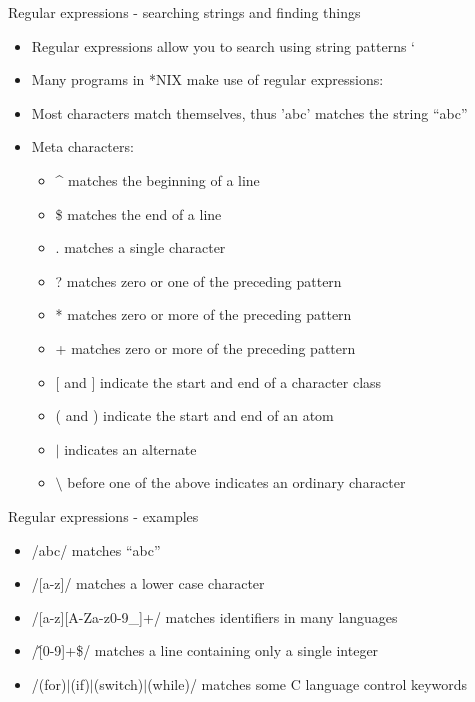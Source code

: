 \documentclass[t]{beamer}
\begin{document}
\begin{frame}{Regular expressions - searching strings and finding things}
  \begin{itemize}
  \item Regular expressions allow you to search using string patterns
` \item Many programs in *NIX make use of regular expressions:
  \item Most characters match themselves, thus 'abc' matches the
    string  ``abc''
  \item Meta characters:
    \begin{itemize}
    \item \^{ }  matches the beginning of a line
    \item \$ matches the end of a line
    \item . matches a single character
    \item ? matches zero or one of the preceding pattern
    \item * matches zero or more of the preceding pattern
    \item + matches zero or more of the preceding pattern
    \item $\lbrack$ and $\rbrack$ indicate the start and end of a character class
    \item ( and ) indicate the start and end of an atom
    \item $\mid$ indicates an alternate
    \item $\setminus$ before one of the above indicates an ordinary character
    \end{itemize}
  \end{itemize}
\end{frame}

\begin{frame}{Regular expressions - examples}
  \begin{itemize}
  \item /abc/  matches ``abc''
  \item /[a-z]/ matches a lower case character
  \item /[a-z][A-Za-z0-9\_]+/ matches identifiers in many languages
  \item /\^[0-9]+\$/ matches a line containing only a single integer
  \item /(for)$\mid$(if)$\mid$(switch)$\mid$(while)/ matches some C language control keywords
  \end{itemize}
  \note{}
\end{frame}
\end{document}
